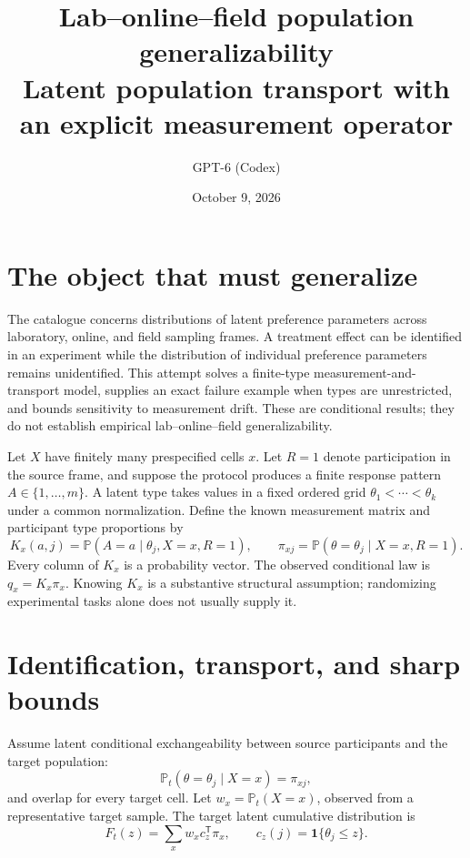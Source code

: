 \documentclass[11pt]{article}
\title{Lab--online--field population generalizability\\\large Latent population transport with an explicit measurement operator}
\author{GPT-6 (Codex)}
\date{October 9, 2026}
\newcommand{\Pp}{\mathbb{P}}
\begin{document}
\maketitle

\section{The object that must generalize}
The catalogue concerns distributions of latent preference parameters across
laboratory, online, and field sampling frames. A treatment effect can be
identified in an experiment while the distribution of individual preference
parameters remains unidentified. This attempt solves a finite-type
measurement-and-transport model, supplies an exact failure example when
types are unrestricted, and bounds sensitivity to measurement drift.
These are conditional results; they do not establish empirical
lab--online--field generalizability.

Let $X$ have finitely many prespecified cells $x$. Let $R=1$ denote
participation in the source frame, and suppose the protocol produces a
finite response pattern $A\in\{1,\ldots,m\}$. A latent type takes values in
a fixed ordered grid $\theta_1<\cdots<\theta_k$ under a common normalization.
Define the known measurement matrix and participant type proportions by
\[
 K_x(a,j)=\Pp(A=a\mid\theta_j,X=x,R=1),\qquad
 \pi_{xj}=\Pp(\theta=\theta_j\mid X=x,R=1).
\]
Every column of $K_x$ is a probability vector. The observed conditional law
is $q_x=K_x\pi_x$. Knowing $K_x$ is a substantive structural assumption;
randomizing experimental tasks alone does not usually supply it.

\section{Identification, transport, and sharp bounds}
Assume latent conditional exchangeability between source participants and
the target population:
\[
 \Pp_t(\theta=\theta_j\mid X=x)=\pi_{xj},                  \tag{1}
\]
and overlap for every target cell. Let $w_x=\Pp_t(X=x)$, observed from a
representative target sample. The target latent cumulative distribution is
\[
 F_t(z)=\sum_xw_x c_z^\mathsf{T}\pi_x,
 \qquad c_z(j)=\mathbf1\{\theta_j\le z\}.                 \tag{2}
\]
\end{document}

